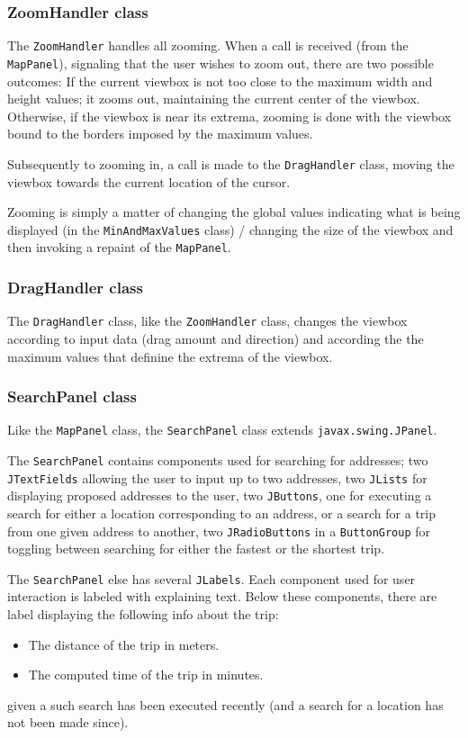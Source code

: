 \documentclass[a4paper,11pt]{article}
\begin{document}
\subsubsection{ZoomHandler class} %
The \texttt{ZoomHandler} handles all zooming. When a call is received (from the \texttt{MapPanel}), signaling that the user wishes to zoom out, there are two possible outcomes: If the current viewbox is not too close to the maximum width and height values; it zooms out, maintaining the current center of the viewbox. Otherwise, if the viewbox is near its extrema, zooming is done with the viewbox bound to the borders imposed by the maximum values.

Subsequently to zooming in, a call is made to the \texttt{DragHandler} class, moving the viewbox towards the current location of the cursor.

Zooming is simply a matter of changing the global values indicating what is being displayed (in the \texttt{MinAndMaxValues} class) / changing the size of the viewbox and then invoking a repaint of the \texttt{MapPanel}.

\subsubsection{DragHandler class} %
The \texttt{DragHandler} class, like the \texttt{ZoomHandler} class, changes the viewbox according to input data (drag amount and direction) and according the the maximum values that definine the extrema of the viewbox.

\subsubsection{SearchPanel class}
Like the \texttt{MapPanel} class, the \texttt{SearchPanel} class extends \texttt{javax.swing.JPanel}.

The \texttt{SearchPanel} contains components used for searching for addresses; two \texttt{JTextFields} allowing the user to input up to two addresses, two \texttt{JLists} for displaying proposed addresses to the user, two \texttt{JButtons}, one for executing a search for either a location corresponding to an address, or a search for a trip from one given address to another, two \texttt{JRadioButtons} in a \texttt{ButtonGroup} for toggling between searching for either the fastest or the shortest trip.

The \texttt{SearchPanel} else has several \texttt{JLabels}. Each component used for user interaction is labeled with explaining text. Below these components, there are label displaying the following info about the trip:
\begin{itemize}
 \item The distance of the trip in meters.
 \item The computed time of the trip in minutes.
\end{itemize}
given a such search has been executed recently (and a search for a location has not been made since).
\end{document}
